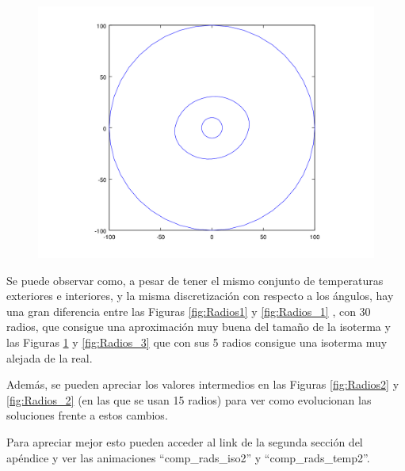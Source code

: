 \begin{figure}[H]
\begin{minipage}{0.30\textwidth}
  \centering
    \includegraphics[width=1\textwidth]{imgs/comp_rads_bueno/comp_radss_iso0.png} 
    \caption{} 
  \label{fig:Radios3}
\end{minipage}
\end{figure}

Se puede observar como, a pesar de tener el mismo conjunto de temperaturas exteriores e interiores, y la misma discretización con respecto a los ángulos, hay una gran diferencia entre las Figuras \ref{fig:Radios1} y \ref{fig:Radios_1} , con 30 radios, que consigue una aproximación muy buena del tamaño de la isoterma y las Figuras \ref{fig:Radios3} y \ref{fig:Radios_3} que con sus 5 radios consigue una isoterma muy alejada de la real.

Además, se pueden apreciar los valores intermedios en las Figuras \ref{fig:Radios2} y \ref{fig:Radios_2} (en las que se usan 15 radios) para ver como evolucionan las soluciones frente a estos cambios.

Para apreciar mejor esto pueden acceder al link de la segunda sección del apéndice y ver las animaciones ``comp\_rads\_iso2'' y ``comp\_rads\_temp2''.









